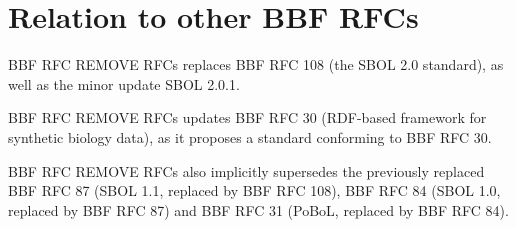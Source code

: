 \newcommand\rfcnum{REMOVE RFCs}

\section{Relation to other BBF RFCs}

BBF RFC \rfcnum{} replaces BBF RFC 108 (the SBOL 2.0 standard), as well as the minor update SBOL 2.0.1.

BBF RFC \rfcnum{} updates BBF RFC 30 (RDF-based framework for synthetic biology data), as it proposes a standard conforming to BBF RFC 30.

BBF RFC \rfcnum{} also implicitly supersedes the previously replaced BBF RFC 87 (SBOL 1.1, replaced by BBF RFC 108), BBF RFC 84 (SBOL 1.0, replaced by BBF RFC 87) and BBF RFC 31 (PoBoL, replaced by BBF RFC 84).
